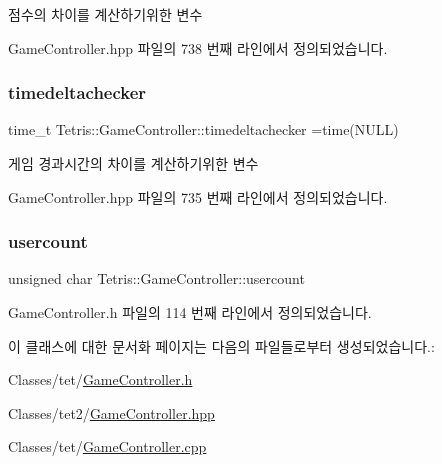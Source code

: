 점수의 차이를 계산하기위한 변수 



Game\+Controller.\+hpp 파일의 738 번째 라인에서 정의되었습니다.

\mbox{\label{class_tetris_1_1_game_controller_a41b29ef9d04dcdc824e144a8a2cab543}} 
\subsubsection{\texorpdfstring{timedeltachecker}{timedeltachecker}}
{\footnotesize\ttfamily time\+\_\+t Tetris\+::\+Game\+Controller\+::timedeltachecker =time(N\+U\+LL)\hspace{0.3cm}{\ttfamily [private]}}



게임 경과시간의 차이를 계산하기위한 변수 



Game\+Controller.\+hpp 파일의 735 번째 라인에서 정의되었습니다.

\mbox{\label{class_tetris_1_1_game_controller_aafb18b3b4fe5621bfb60fc42b1e8da09}} 
\subsubsection{\texorpdfstring{usercount}{usercount}}
{\footnotesize\ttfamily unsigned char Tetris\+::\+Game\+Controller\+::usercount\hspace{0.3cm}{\ttfamily [protected]}}



Game\+Controller.\+h 파일의 114 번째 라인에서 정의되었습니다.



이 클래스에 대한 문서화 페이지는 다음의 파일들로부터 생성되었습니다.\+:\begin{DoxyCompactItemize}
\item 
Classes/tet/\hyperlink{_game_controller_8h}{Game\+Controller.\+h}\item 
Classes/tet2/\hyperlink{_game_controller_8hpp}{Game\+Controller.\+hpp}\item 
Classes/tet/\hyperlink{_game_controller_8cpp}{Game\+Controller.\+cpp}\end{DoxyCompactItemize}

